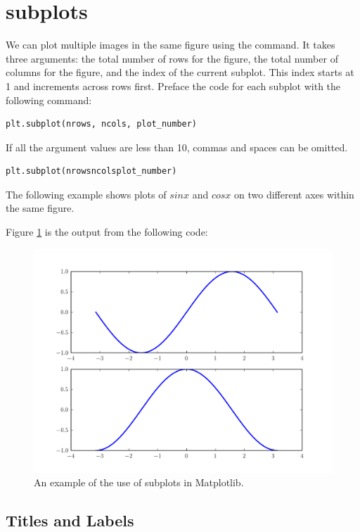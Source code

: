 \section*{subplots}

We can plot multiple images in the same figure using the  command. 
It takes three arguments: the total number of rows for the figure, the total number of columns for the figure, and the index of the current subplot. 
This index starts at 1 and increments across rows first. 
Preface the code for each subplot with the following command:
\begin{lstlisting}
plt.subplot(nrows, ncols, plot_number)
\end{lstlisting}
If all the argument values are less than 10, commas and spaces can be 
omitted. 
\begin{lstlisting}
plt.subplot(nrowsncolsplot_number)
\end{lstlisting} 

The following example shows plots of $sin x$ and $cos x$ on two 
different axes within the same figure.

Figure \ref{mpl:subplots} is the output from the following code:



\begin{figure} 
\includegraphics[width=\textwidth]{subplots.pdf}
\caption{An example of the use of subplots in Matplotlib.}
\label{mpl:subplots} 
\end{figure}

\subsection*{Titles and Labels}

